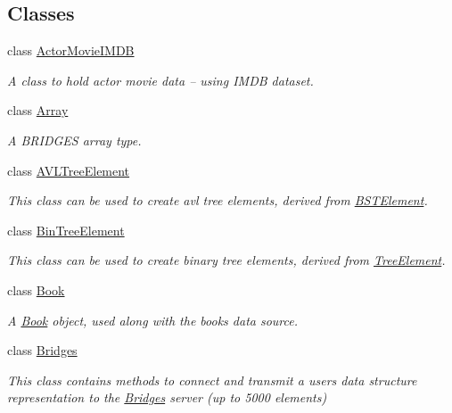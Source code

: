 \subsection*{Classes}
\begin{DoxyCompactItemize}
\item 
class \mbox{\hyperlink{classbridges_1_1_actor_movie_i_m_d_b}{Actor\+Movie\+I\+M\+DB}}
\begin{DoxyCompactList}\small\item\em A class to hold actor movie data -- using I\+M\+DB dataset. \end{DoxyCompactList}\item 
class \mbox{\hyperlink{classbridges_1_1_array}{Array}}
\begin{DoxyCompactList}\small\item\em A B\+R\+I\+D\+G\+ES array type. \end{DoxyCompactList}\item 
class \mbox{\hyperlink{classbridges_1_1_a_v_l_tree_element}{A\+V\+L\+Tree\+Element}}
\begin{DoxyCompactList}\small\item\em This class can be used to create avl tree elements, derived from \mbox{\hyperlink{classbridges_1_1_b_s_t_element}{B\+S\+T\+Element}}. \end{DoxyCompactList}\item 
class \mbox{\hyperlink{classbridges_1_1_bin_tree_element}{Bin\+Tree\+Element}}
\begin{DoxyCompactList}\small\item\em This class can be used to create binary tree elements, derived from \mbox{\hyperlink{classbridges_1_1_tree_element}{Tree\+Element}}. \end{DoxyCompactList}\item 
class \mbox{\hyperlink{classbridges_1_1_book}{Book}}
\begin{DoxyCompactList}\small\item\em A \mbox{\hyperlink{classbridges_1_1_book}{Book}} object, used along with the books data source. \end{DoxyCompactList}\item 
class \mbox{\hyperlink{classbridges_1_1_bridges}{Bridges}}
\begin{DoxyCompactList}\small\item\em This class contains methods to connect and transmit a user\textquotesingle{}s data structure representation to the \mbox{\hyperlink{classbridges_1_1_bridges}{Bridges}} server (up to 5000 elements) \end{DoxyCompactList}\item 

\end{DoxyCompactItemize}
